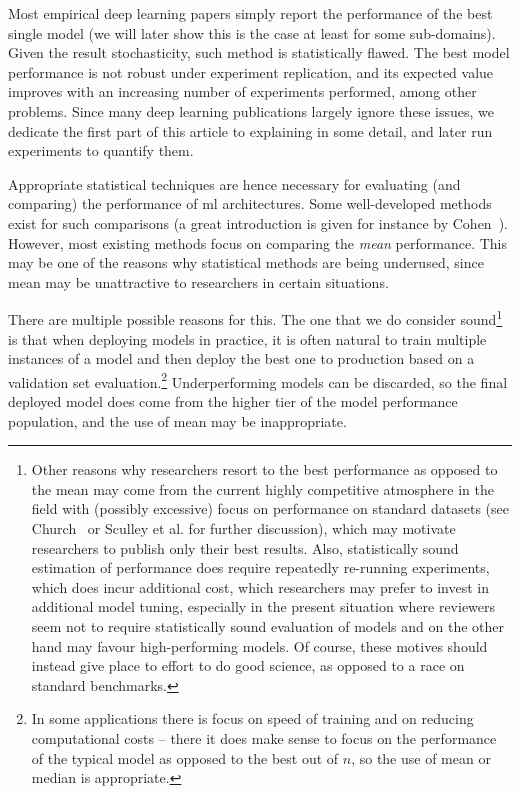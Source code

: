 \documentclass{article}
\newcommand{\ml}{\gls{ml}\xspace}
\newcommand{\dl}{deep learning\xspace}
\begin{document}
Most empirical \dl papers simply report the performance of the best single model (we will later show this is the case at least for some sub-domains). Given the result stochasticity, such method is statistically flawed. The best model performance is not robust under experiment replication, and its expected value improves with an increasing number of experiments performed, among other problems. Since many deep learning publications largely ignore these issues, we dedicate the first part of this article to explaining in some detail, and later run experiments to quantify them.

Appropriate statistical techniques are hence necessary for evaluating (and comparing) the performance of \ml architectures. Some well-developed methods exist for such comparisons (a great introduction is given for instance by Cohen~). However, most existing methods focus on comparing the \emph{mean} performance. This may be one of the reasons why statistical methods are being underused, since mean may be unattractive to researchers in certain situations. 

There are multiple possible reasons for this. The one that we do consider sound\footnote{Other reasons why researchers resort to the best performance as opposed to the mean may come from the current highly competitive atmosphere in the field with (possibly excessive) focus on performance on standard datasets (see Church~ or Sculley et al.  for further discussion), which may motivate researchers to publish only their best results. Also, statistically sound estimation of performance does require repeatedly re-running experiments, which does incur additional cost, which researchers may prefer to invest in additional model tuning, especially in the present situation where reviewers seem not to require statistically sound evaluation of models and on the other hand may favour high-performing models. Of course, these motives should instead give place to effort to do good science, as opposed to a race on standard benchmarks.} is that when deploying models in practice, it is often natural to train multiple instances of a model and then deploy the best one to production based on a validation set evaluation.\footnote{In some applications there is focus on speed of training and on reducing computational costs -- there it does make sense to focus on the performance of the typical model as opposed to the best out of $n$, so the use of mean or median is appropriate.} Underperforming models can be discarded, so the final deployed model does come from the higher tier of the model performance population, and the use of mean may be inappropriate.
\end{document}
